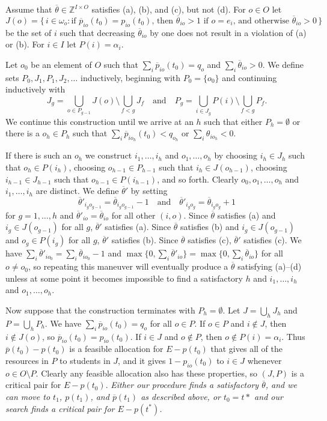 \documentclass[12pt]{article}
\theoremstyle{definition}
\newcommand{\In}{\mathbb{Z}}
\newcommand{\barp}{\overline{p}}
\newcommand{\bartheta}{{\overline \theta}}
\begin{document}
\begin{appendix}
Assume that $\bartheta \in \In^{I \times O}$ satisfies (a), (b), and
(c), but not (d).  For $o \in O$ let
$$J(o) = \{\, i \in \omega_o : \text{if $\barp_{io}(t_0) =
  p_{io}(t_0)$, then $\bartheta_{io} > 1$ if $o = e_i$, and otherwise
  $\bartheta_{io} > 0$} \,\}$$ be the set of $i$ such that decreasing
$\bartheta_{io}$ by one does not result in a violation of (a) or (b).
For $i \in I$ let $P(i) = \alpha_i$.

Let $o_0$ be an element of $O$ such that $\sum_i \barp_{io}(t_0) =
q_o$ and $\sum_i \bartheta_{io} > 0$.  We define sets $P_0, J_1, P_1,
J_2, \ldots$ inductively, beginning with $P_0 = \{o_0\}$ and
continuing inductively with $$J_g = \bigcup_{o \in P_{g-1}} J(o)
\setminus \bigcup_{f < g} J_f \quad \text{and} \quad P_g = \bigcup_{i
  \in J_g} P(i) \setminus \bigcup_{f < g} P_f.$$ We continue this
construction until we arrive at an $h$ such that either $P_h =
\emptyset$ or there is a $o_h \in P_h$ such that $\sum_i
\barp_{io_h}(t_0) < q_{o_h}$ or $\sum_i \theta_{io_h} < 0$.

If there is such an $o_h$ we construct $i_1, \ldots, i_h$ and $o_1,
\ldots, o_h$ by choosing $i_h \in J_h$ such that $o_h \in P(i_h)$,
choosing $o_{h-1} \in P_{h-1}$ such that $i_h \in J(o_{h-1})$,
choosing $i_{h-1} \in J_{h-1}$ such that $o_{h-1} \in P(i_{h-1})$, and
so forth.  Clearly $o_0,o_1, \ldots, o_h$ and $i_1, \ldots, i_h$ are
distinct.  We define $\bartheta'$ by setting $$\bartheta'_{i_go_{g-1}}
= \bartheta_{i_go_{g-1}} - 1 \quad \text{and} \quad
\bartheta'_{i_go_g} = \bartheta_{i_go_g} + 1$$ for $g = 1, \ldots, h$
and $\bartheta'_{io} = \bartheta_{io}$ for all other $(i,o)$.  Since
$\bartheta$ satisfies (a) and $i_g \in J(o_{g-1})$ for all $g$,
$\bartheta'$ satisfies (a).  Since $\bartheta$ satisfies (b) and $i_g
\in J(o_{g-1})$ and $o_g \in P(i_g)$ for all $g$, $\bartheta'$
satisfies (b).  Since $\bartheta$ satisfies (c), $\bartheta'$
satisfies (c).  We have $\sum_i \bartheta'_{io_0} = \sum_i
\bartheta_{io_0} - 1$ and $\max \{0,\sum_i \bartheta'_{io}\} = \max
\{0,\sum_i \bartheta_{io}\}$ for all $o \ne o_0$, so repeating this
maneuver will eventually produce a $\bartheta$ satisfying (a)--(d)
unless at some point it becomes impossible to find a satisfactory $h$
and $i_1, \ldots, i_h$ and $o_1, \ldots, o_h$.

Now suppose that the construction terminates with $P_h = \emptyset$.
Let $J = \bigcup_h J_h$ and $P = \bigcup_h P_h$.  We have $\sum_i
\barp_{io}(t_0) = q_o$ for all $o \in P$.  If $o \in P$ and $i \notin
J$, then $i \notin J(o)$, so $\barp_{io}(t_0) = p_{io}(t_0)$.  If $i
\in J$ and $o \notin P$, then $o \notin P(i) = \alpha_i$.  Thus
$\barp(t_0) - p(t_0)$ is a feasible allocation for $E - p(t_0)$ that
gives all of the resources in $P$ to students in $J$, and it gives $1
- p_{io}(t_0)$ to $i \in J$ whenever $o \in O \setminus P$. Clearly
any feasible allocation also has these properties, so $(J,P)$ is a
critical pair for $E - p(t_0)$.  \emph{Either our procedure finds a
satisfactory $\bartheta$, and we can move to $t_1$, $p(t_1)$, and
$\barp(t_1)$ as described above, or $t_0 = t*$ and our search finds a
critical pair for $E - p(t^*)$.}


\end{appendix}
\end{document}
